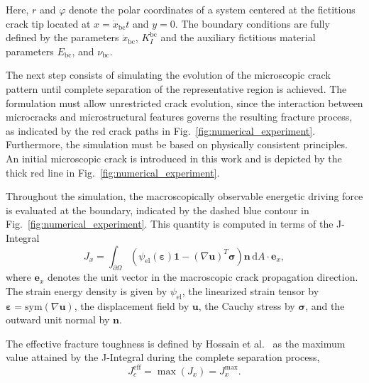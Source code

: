 \documentclass[pdflatex,sn-mathphys-num]{sn-jnl}%
\theoremstyle{thmstyleone}%
\theoremstyle{thmstyletwo}%
\theoremstyle{thmstylethree}%
\begin{document}
Here, $r$ and $\varphi$ denote the polar coordinates of a system centered at the fictitious 
crack tip located at $x = \dot{x}_{\text{bc}} t$ and $y = 0$.
The boundary conditions are fully defined by the 
parameters $\dot{x}_{\text{bc}}$, $K_I^{\text{bc}}$ and the auxiliary fictitious material parameters  
$E_{\text{bc}}$, and $\nu_{\text{bc}}$.

The next step consists of simulating the evolution of the microscopic crack pattern until complete separation of the representative region is achieved.
The formulation must allow unrestricted crack evolution, since the interaction between microcracks and microstructural features governs the resulting fracture process, as indicated by the red crack paths in Fig.~\ref{fig:numerical_experiment}.
Furthermore, the simulation must be based on physically consistent principles.
An initial microscopic crack is introduced in this work and is depicted by the thick red line in Fig.~\ref{fig:numerical_experiment}.

Throughout the simulation, the macroscopically observable energetic driving force is evaluated at the boundary, indicated by the dashed blue contour in Fig.~\ref{fig:numerical_experiment}.
This quantity is computed in terms of the J-Integral
\begin{equation}
    J_x = \int_{\partial\Omega}\left(\psi_{\text{el}}(\boldsymbol{\varepsilon})\boldsymbol{1} - \left(\nabla\boldsymbol{u}\right)^T\boldsymbol{\sigma}\right)\boldsymbol{n} \, \mathrm{d}A \cdot \boldsymbol{e}_x,
    \label{eq:J-integral}
\end{equation}
where $\boldsymbol{e}_x$ denotes the unit vector in the macroscopic crack propagation direction.
The strain energy density is given by $\psi_{\text{el}}$, the linearized strain tensor by $\boldsymbol{\varepsilon} = \text{sym}(\nabla{\boldsymbol{u}})$, the displacement field by $\boldsymbol{u}$, the Cauchy stress by $\boldsymbol{\sigma}$, and the outward unit normal by $\boldsymbol{n}$.

The effective fracture toughness is defined by Hossain et al.~\cite{hossain_effective_2014} as the maximum value attained by the J-Integral during the complete separation process,
\begin{equation}
    J_c^{\text{eff}} = \max(J_x) = J_x^{\text{max}}.
\end{equation}
\end{document}
